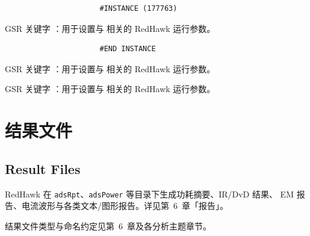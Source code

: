 \begin{lstlisting}
                      #INSTANCE (177763)
\end{lstlisting}

GSR 关键字 ：用于设置与  相关的 RedHawk 运行参数。

\begin{lstlisting}
                      #END INSTANCE
\end{lstlisting}

GSR 关键字 ：用于设置与  相关的 RedHawk 运行参数。

GSR 关键字 ：用于设置与  相关的 RedHawk 运行参数。

\section{结果文件}
\subsection*{Result Files}

RedHawk 在 \texttt{adsRpt}、\texttt{adsPower} 等目录下生成功耗摘要、IR/DvD 结果、
EM 报告、电流波形与各类文本/图形报告。详见第~6~章「报告」。

\begin{seeAlsoBox}
结果文件类型与命名约定见第~6~章及各分析主题章节。
\end{seeAlsoBox}
